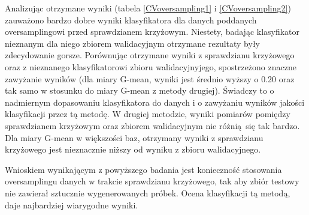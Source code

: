 Analizując otrzymane wyniki (tabela \ref{CVoversampling1} i \ref{CVoversampling2}) zauważono bardzo dobre wyniki klasyfikatora dla danych poddanych oversamplingowi przed sprawdzianem krzyżowym. Niestety, badając klasyfikator nieznanym dla niego zbiorem walidacyjnym otrzymane rezultaty były zdecydowanie gorsze. Porównując otrzymane wyniki z sprawdzianu krzyżowego oraz z nieznanego klasyfikatorowi zbioru walidacyjnyjego, spostrzeżono znaczne zawyżanie wyników (dla miary G-mean, wyniki jest średnio wyższy o 0.20 oraz tak samo w stosunku do miary G-mean z metody drugiej). Świadczy to o nadmiernym dopasowaniu klasyfikatora do danych i o zawyżaniu wyników jakości klasyfikacji przez tą metodę. W drugiej metodzie, wyniki pomiarów pomiędzy sprawdzianem krzyżowym oraz zbiorem walidacyjnym nie różnią się tak bardzo. Dla miary G-mean w większości baz, otrzymany wyniki z sprawdzianu krzyżowego jest nieznacznie niższy od wyniku z zbioru walidacyjnego. \par
Wnioskiem wynikającym z powyższego badania jest konieczność stosowania oversamplingu danych w trakcie sprawdzianu krzyżowego, tak aby zbiór testowy nie zawierał sztucznie wygenerowanych próbek. Ocena klasyfikacji tą metodą, daje najbardziej wiarygodne wyniki.
